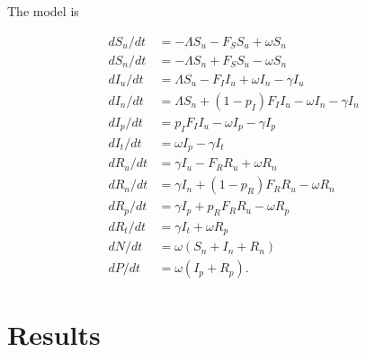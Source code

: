 \documentclass{article}\usepackage[]{graphicx}\usepackage[]{color}
\begin{document}
The model is

\begin{align}
\label{mod:1}
 d S_u/dt &= -\Lambda S_u - F_S S_u + \omega S_n \\
 d S_n/dt &= -\Lambda S_n + F_S S_u - \omega S_n \\
 d I_u/dt &= \Lambda S_u - F_I I_u + \omega I_n  - \gamma I_u  \\
 d I_n/dt &= \Lambda S_n + (1-p_I) F_I I_u - \omega I_n -\gamma I_n \\
 d I_p/dt &= p_I F_I I_u - \omega I_p -\gamma I_p \\
 d I_t/dt &= \omega I_p - \gamma I_t  \\
 d R_u/dt &= \gamma I_u - F_R R_u + \omega R_n \\
 d R_n/dt &= \gamma I_n + (1-p_R) F_R R_u - \omega R_n  \\
 d R_p/dt &= \gamma I_p + p_R F_R R_u  - \omega R_p  \\
 d R_t/dt&= \gamma I_t + \omega R_p  \\
 dN/dt &= \omega (S_n + I_n + R_n)   \\
 dP/dt &= \omega(I_p + R_p).
\end{align}

\section{Results}
\end{document}
